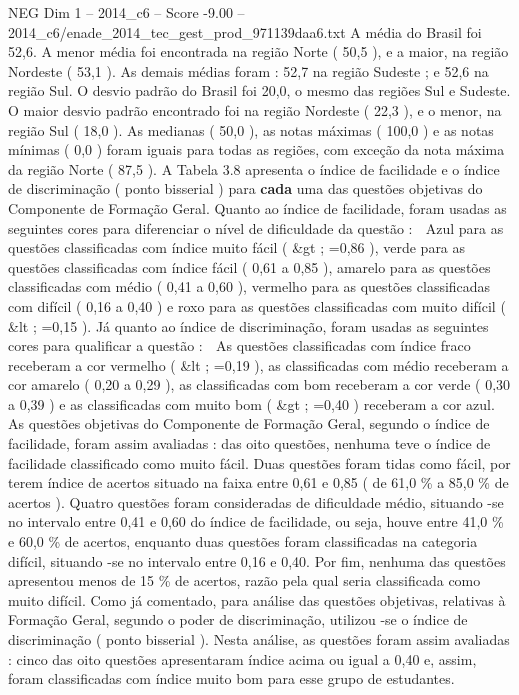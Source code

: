 \begin{textsample}{NEG Dim 1 – 2014\_c6 – Score -9.00 – 2014\_c6/enade\_2014\_tec\_gest\_prod\_971139daa6.txt}
A média do Brasil foi 52,6.
A menor média foi encontrada na região Norte ( 50,5 ), e a maior, na região Nordeste ( 53,1 ).
As demais médias foram : 52,7 na região Sudeste ; e 52,6 na região Sul.
O desvio padrão do Brasil foi 20,0, o mesmo das regiões Sul e Sudeste.
O maior desvio padrão encontrado foi na região Nordeste ( 22,3 ), e o menor, na região Sul ( 18,0 ).
As medianas ( 50,0 ), as notas máximas ( 100,0 ) e as notas mínimas ( 0,0 ) foram iguais para todas as regiões, com exceção da nota máxima da região Norte ( 87,5 ).
A Tabela 3.8 apresenta o índice de facilidade e o índice de discriminação ( ponto bisserial ) para \textbf{cada} uma das questões objetivas do Componente de Formação Geral.
Quanto ao índice de facilidade, foram usadas as seguintes cores para diferenciar o nível de dificuldade da questão :  Azul para as questões classificadas com índice muito fácil ( \&gt ; =0,86 ), verde para as questões classificadas com índice fácil ( 0,61 a 0,85 ), amarelo para as questões classificadas com médio ( 0,41 a 0,60 ), vermelho para as questões classificadas com difícil ( 0,16 a 0,40 ) e roxo para as questões classificadas com muito difícil ( \&lt ; =0,15 ).
Já quanto ao índice de discriminação, foram usadas as seguintes cores para qualificar a questão :  As questões classificadas com índice fraco receberam a cor vermelho ( \&lt ; =0,19 ), as classificadas com médio receberam a cor amarelo ( 0,20 a 0,29 ), as classificadas com bom receberam a cor verde ( 0,30 a 0,39 ) e as classificadas com muito bom ( \&gt ; =0,40 ) receberam a cor azul.
As questões objetivas do Componente de Formação Geral, segundo o índice de facilidade, foram assim avaliadas : das oito questões, nenhuma teve o índice de facilidade classificado como muito fácil.
Duas questões foram tidas como fácil, por terem índice de acertos situado na faixa entre 0,61 e 0,85 ( de 61,0 \% a 85,0 \% de acertos ).
Quatro questões foram consideradas de dificuldade médio, situando -se no intervalo entre 0,41 e 0,60 do índice de facilidade, ou seja, houve entre 41,0 \% e 60,0 \% de acertos, enquanto duas questões foram classificadas na categoria difícil, situando -se no intervalo entre 0,16 e 0,40.
Por fim, nenhuma das questões apresentou menos de 15 \% de acertos, razão pela qual seria classificada como muito difícil.
Como já comentado, para análise das questões objetivas, relativas à Formação Geral, segundo o poder de discriminação, utilizou -se o índice de discriminação ( ponto bisserial ).
Nesta análise, as questões foram assim avaliadas : cinco das oito questões apresentaram índice acima ou igual a 0,40 e, assim, foram classificadas com índice muito bom para esse grupo de estudantes.

\end{textsample}
